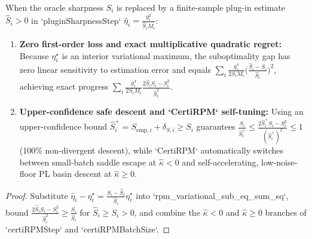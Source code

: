 \begin{lemma}\label{lem:certi_rpm}
\leanok
{}
When the oracle sharpness $S_i$ is replaced by a finite-sample plug-in estimate $\hat{S}_i > 0$ in `pluginSharpnessStep` $\hat{\eta}_i = \frac{g_i^2}{\hat{S}_i M_i}$:
\begin{enumerate}
\item \textbf{Zero first-order loss and exact multiplicative quadratic regret:} Because $\eta_i^\star$ is an interior variational maximum, the suboptimality gap has zero linear sensitivity to estimation error and equals $\sum_i \frac{g_i^4}{2S_i M_i}\bigl(\frac{\hat{S}_i - S_i}{\hat{S}_i}\bigr)^2$, achieving exact progress $\sum_i \frac{g_i^4}{2S_i M_i}\frac{2\hat{S}_i S_i - S_i^2}{\hat{S}_i^2}$.
\item \textbf{Upper-confidence safe descent and `CertiRPM` self-tuning:} Using an upper-confidence bound $\hat{S}_i^+ = S_{\mathrm{emp},i} + \delta_{S,i} \ge S_i$ guarantees $\frac{S_i}{\hat{S}_i^+} \le \frac{2\hat{S}_i^+ S_i - S_i^2}{(\hat{S}_i^+)^2} \le 1$ (100\% non-divergent descent), while `CertiRPM` automatically switches between small-batch saddle escape at $\hat{\kappa} < 0$ and self-accelerating, low-noise-floor PL basin descent at $\hat{\kappa} \ge 0$.
\end{enumerate}
\end{lemma}
\begin{proof}
\leanok
Substitute $\hat{\eta}_i - \eta_i^\star = \frac{S_i - \hat{S}_i}{\hat{S}_i}\eta_i^\star$ into `rpm_variational_sub_eq_sum_sq`, bound $\frac{2\hat{S}_i S_i - S_i^2}{\hat{S}_i^2} \ge \frac{S_i}{\hat{S}_i}$ for $\hat{S}_i \ge S_i > 0$, and combine the $\hat{\kappa} < 0$ and $\hat{\kappa} \ge 0$ branches of `certiRPMStep` and `certiRPMBatchSize`.
\end{proof}

